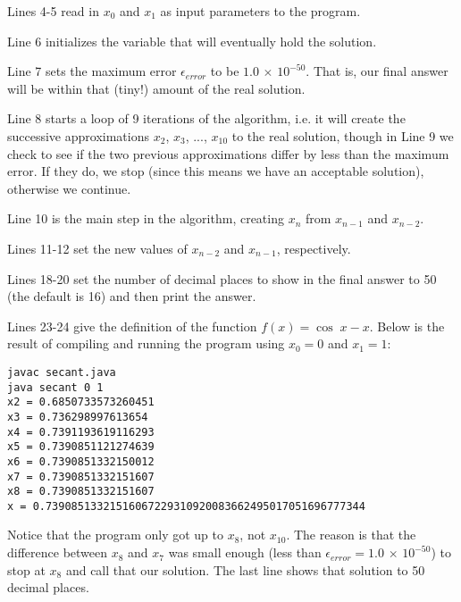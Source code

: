 \par\noindent Lines 4-5 read in $x_0$ and $x_1$ as input parameters to the program.

\par\noindent Line 6 initializes the variable that will eventually hold the solution.

\par\noindent Line 7 sets the maximum error $\epsilon_{error}$ to be $1.0 \,\times\, 10^{-50}$. That
is, our final answer will be within that (tiny!) amount of the real solution.

\par\noindent Line 8 starts a loop of 9 iterations of the algorithm, i.e. it will create the
successive approximations $x_2$, $x_3$, $...$, $x_{10}$ to the real solution, though in Line 9 we
check to see if the two previous approximations differ by less than the maximum error. If they do,
we stop (since this means we have an acceptable solution), otherwise we continue.

\par\noindent Line 10 is the main step in the algorithm, creating $x_n$ from $x_{n-1}$ and
$x_{n-2}$.

\par\noindent Lines 11-12 set the new values of $x_{n-2}$ and $x_{n-1}$, respectively.

\par\noindent Lines 18-20 set the number of decimal places to show in the final answer
to 50 (the default is 16) and then print the answer.

\par\noindent Lines 23-24 give the definition of the function $f(x)=\cos\;x - x$.
\newpage
Below is the result of compiling and running the program using $x_0 = 0$ and $x_1 = 1$:

\begin{verbatim}
javac secant.java
java secant 0 1
x2 = 0.6850733573260451
x3 = 0.736298997613654
x4 = 0.7391193619116293
x5 = 0.7390851121274639
x6 = 0.7390851332150012
x7 = 0.7390851332151607
x8 = 0.7390851332151607
x = 0.73908513321516067229310920083662495017051696777344
\end{verbatim}

Notice that the program only got up to $x_8$, not $x_{10}$. The reason is that the difference
between $x_8$ and $x_7$ was small enough (less than $\epsilon_{error} = 1.0 \,\times\, 10^{-50}$)
to stop at $x_8$ and call that our solution.
The last line shows that solution to 50 decimal places.

